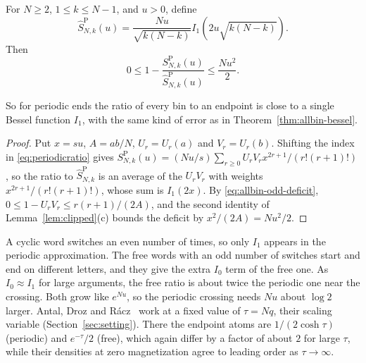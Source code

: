 \begin{theorem}\label{thm:periodic-bessel}
For $N\ge2$, $1\le k\le N-1$, and $u>0$, define
\[
\widehat S^{\mathrm P}_{N,k}(u)=\frac{Nu}{\sqrt{k(N-k)}}
 I_1\!\left(2u\sqrt{k(N-k)}\right).
\]
Then
\begin{equation}\label{eq:periodicbound}
0\le1-\frac{S^{\mathrm P}_{N,k}(u)}{\widehat S^{\mathrm P}_{N,k}(u)}
\le\frac{Nu^2}{2}.
\end{equation}
\end{theorem}

So for periodic ends the ratio of every bin to an endpoint is close to
a single Bessel function $I_1$, with the same kind of error as in Theorem~\ref{thm:allbin-bessel}.

\begin{proof}
Put $x=su$, $A=ab/N$, $U_r=U_r(a)$ and $V_r=U_r(b)$. Shifting the index in
\eqref{eq:periodicratio} gives
$S^{\mathrm P}_{N,k}(u)=(Nu/s)\sum_{r\ge0}U_rV_rx^{2r+1}/(r!(r+1)!)$, so the
ratio to $\widehat S^{\mathrm P}_{N,k}$ is an average of the $U_rV_r$ with
weights $x^{2r+1}/(r!(r+1)!)$, whose sum is $I_1(2x)$. By
\eqref{eq:allbin-odd-deficit}, $0\le1-U_rV_r\le r(r+1)/(2A)$, and the second
identity of Lemma~\ref{lem:clipped}(c) bounds the deficit by
$x^2/(2A)=Nu^2/2$.
\end{proof}

A cyclic word switches an
even number of times, so only $I_1$ appears in the periodic approximation.
The free words with an odd number of switches start and end on
different letters, and they give the extra $I_0$ term of the free one.
As $I_0\approx I_1$ for large arguments, the free ratio is about twice the
periodic one near the crossing. Both grow like $e^{Nu}$, so the periodic
crossing needs $Nu$ about $\log2$ larger. Antal, Droz and
R\'acz~\cite[Eqs.~(37) and~(47)]{antal2004} work at a fixed value of $\tau=Nq$, their scaling variable
(Section~\ref{sec:setting}). There the endpoint atoms are
$1/(2\cosh \tau)$ (periodic) and $e^{-\tau}/2$ (free), which again differ by a
factor of about $2$ for large $\tau$, while their densities at zero magnetization
agree to leading order as $\tau\to\infty$.

